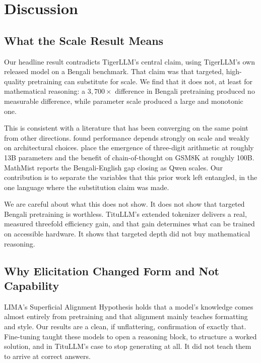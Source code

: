 \section{Discussion}
\label{sec:discussion}

\subsection{What the Scale Result Means}

Our headline result contradicts TigerLLM's central claim, using TigerLLM's own
released model on a Bengali benchmark. That claim was that targeted,
high-quality pretraining can substitute for scale. We find that it does not, at
least for mathematical reasoning: a $3{,}700\times$ difference in Bengali
pretraining produced no measurable difference, while parameter scale produced a
large and monotonic one.

This is consistent with a literature that has been converging on the same point
from other directions. \textcite{kaplan2020scaling} found performance depends %
strongly on scale and weakly on architectural choices. \textcite{wei2022emergent} %
place the emergence of three-digit arithmetic at roughly 13B parameters and the
benefit of chain-of-thought on GSM8K at roughly 100B. MathMist
\parencite{sobhani2026mathmist} reports the Bengali-English gap closing as Qwen
scales. Our contribution is to separate the variables that this prior work left
entangled, in the one language where the substitution claim was made.

We are careful about what this does not show. It does not show that targeted
Bengali pretraining is worthless. TituLLM's extended tokenizer delivers a real,
measured threefold efficiency gain, and that gain determines what can be trained
on accessible hardware. It shows that targeted depth did not buy mathematical
reasoning.

\subsection{Why Elicitation Changed Form and Not Capability}

LIMA's Superficial Alignment Hypothesis \parencite{zhou2023lima} %
holds that a model's knowledge comes almost entirely from pretraining and that
alignment mainly teaches formatting and style. Our results are a clean, if
unflattering, confirmation of exactly that. Fine-tuning taught these models to
open a reasoning block, to structure a worked solution, and in TituLLM's case to
stop generating at all. It did not teach them to arrive at correct answers.

